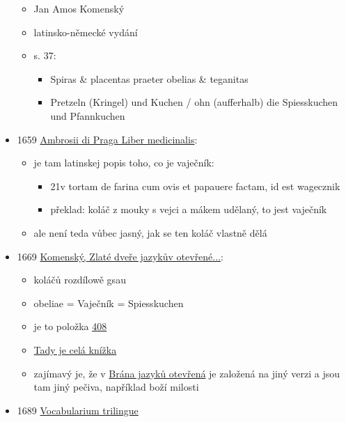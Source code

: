 \begin{itemize}
  \begin{itemize}
  \tightlist
  \item
    Jan Amos Komenský
  \item
    latinsko-německé vydání
  \item
    s. 37:

    \begin{itemize}
    \tightlist
    \item
      Spiras \& placentas praeter obelias \& teganitas
    \item
      Pretzeln (Kringel) und Kuchen / ohn (aufferhalb) die Spiesskuchen
      und Pfannkuchen
    \end{itemize}
  \end{itemize}
\item
  1659
  \href{https://ceskadigitalniknihovna.cz/uuid/uuid:d380c040-c80a-11ea-b7a2-005056827e51}{Ambrosii
  di Praga Liber medicinalis}:

  \begin{itemize}
  \tightlist
  \item
    je tam latinskej popis toho, co je vaječník:

    \begin{itemize}
    \tightlist
    \item
      21v tortam de farina cum ovis et papauere factam, id est wagecznik
    \item
      překlad: koláč z mouky s vejci a mákem udělaný, to jest vaječník
    \end{itemize}
  \item
    ale není teda vůbec jasný, jak se ten koláč vlastně dělá
  \end{itemize}
\item
  1669
  \href{https://vokabular.ujc.cas.cz/moduly/mluvnice/digitalni-kopie-detail/KomJanua1669/strana-76}{Komenský,
  Zlaté dveře jazykův otevřené...}:

  \begin{itemize}
  \tightlist
  \item
    koláčů rozdílowě gsau
  \item
    obeliae = Vaječník = Spiesskuchen
  \item
    je to položka
    \href{https://vokabular.ujc.cas.cz/moduly/mluvnice/digitalni-kopie-detail/KomJanua1669/strana-76}{408}
  \item
    \href{https://vokabular.ujc.cas.cz/moduly/mluvnice/digitalni-kopie-info/KomJanua1669}{Tady
    je celá knížka}
  \item
    zajímavý je, že v
    \href{https://www.digitalniknihovna.cz/mzk/uuid/uuid:c53f79b0-b747-11e4-a7a2-005056827e51}{Brána
    jazyků otevřená} je založená na jiný verzi a jsou tam jiný pečiva,
    například boží milosti
  \end{itemize}
\item
  1689
  \href{https://www.digitale-sammlungen.de/view/bsb11105115?page=42\%2C43}{Vocabularium
  trilingue}


\end{itemize}
